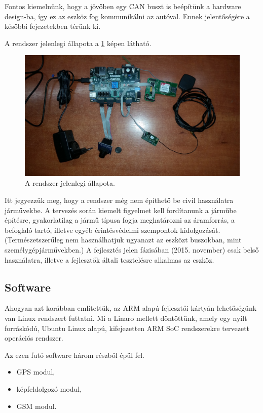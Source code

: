 \documentclass[a4paper,12pt]{report}
\begin{document}
Fontos kiemelnünk, hogy a jövőben egy CAN buszt is beépítünk a hardware design-ba, így ez az eszköz fog kommunikálni az autóval. Ennek jelentőségére a későbbi fejezetekben térünk ki.

A rendszer jelenlegi állapota a \ref{currentsys} képen látható.

\begin{figure}[h]
\centerline{
\includegraphics[width=6in]{img/currentsys}}
\caption{A rendszer jelenlegi állapota.}
\label{currentsys}
\end{figure}

Itt jegyezzük meg, hogy a rendszer még nem építhető be civil használatra járművekbe. A tervezés során kiemelt figyelmet kell fordítanunk a járműbe építésre, gyakorlatilag a jármű típusa fogja meghatározni az áramforrás, a befoglaló tartó, illetve egyéb érintésvédelmi szempontok kidolgozását. (Természetszerűleg nem használhatjuk ugyanazt az eszközt buszokban, mint személygépjárművekben.) A fejlesztés jelen fázisában (2015. november) csak belső használatra, illetve a fejlesztők általi tesztelésre alkalmas az eszköz.

\subsection{Software}
\label{rttasw}

Ahogyan azt korábban említettük, az ARM alapú fejlesztői kártyán lehetőségünk van Linux rendszert futtatni. Mi a Linaro mellett döntöttünk, amely egy nyílt forráskódú, Ubuntu Linux alapú, kifejezetten ARM SoC rendszerekre tervezett operációs rendszer. 

Az ezen futó software három részből épül fel.

\begin{itemize}
\item GPS modul,
\item képfeldolgozó modul,
\item GSM modul.
\end{itemize}
\end{document}

